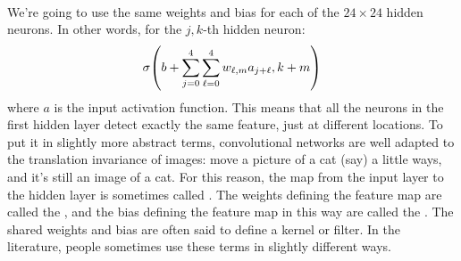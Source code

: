 \paragraph{} We're going to use the same weights and bias for each of the $24\times24$ hidden neurons. In other words, for the $j,k$-th hidden neuron:
\begin{equation}
\sigma \br{b+\sum_{j=0}^4\sum_{\ell=0}^4 w_{\ell, m} a_{j+\ell}, k+m}
\label{eq1:CNN}
\end{equation}
where $a$ is the input activation function. This means that all the neurons in the first hidden layer detect exactly the same feature, just at different locations. To put it in slightly more abstract terms, convolutional networks are well adapted to the translation invariance of images: move a picture of a cat (say) a little ways, and it's still an image of a cat. For this reason, the map from the input layer to the hidden layer is sometimes called . The weights defining the feature map are called the , and the bias defining the feature map in this way are called the . The shared weights and bias are often said to define a kernel or filter. In the literature, people sometimes use these terms in slightly different ways.

